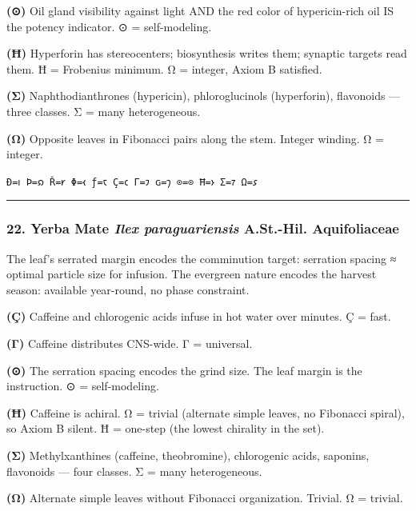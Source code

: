 \textbf{(⊙)} Oil gland visibility against light AND the red color of
hypericin-rich oil IS the potency indicator. ⊙ = self-modeling.

\textbf{(Ħ)} Hyperforin has stereocenters; biosynthesis writes them;
synaptic targets read them. Ħ = Frobenius minimum. Ω = integer, Axiom B
satisfied.

\textbf{(Σ)} Naphthodianthrones (hypericin), phloroglucinols
(hyperforin), flavonoids --- three classes. Σ = many heterogeneous.

\textbf{(Ω)} Opposite leaves in Fibonacci pairs along the stem. Integer
winding. Ω = integer.

\texttt{Ð=𐑦\ Þ=𐑸\ Ř=𐑾\ Φ=𐑬\ ƒ=𐑱\ Ç=𐑤\ Γ=𐑲\ ɢ=𐑠\ ⊙=⊙\ Ħ=𐑶\ Σ=𐑳\ Ω=𐑭}

\begin{center}\rule{0.5\linewidth}{0.5pt}\end{center}

\hypertarget{yerba-mate-ilex-paraguariensis-a.st.-hil.-aquifoliaceae}{%
\subsubsection{\texorpdfstring{22. Yerba Mate \textbar{} \emph{Ilex
paraguariensis} A.St.-Hil. \textbar{}
Aquifoliaceae}{22. Yerba Mate \textbar{} Ilex paraguariensis A.St.-Hil. \textbar{} Aquifoliaceae}}\label{yerba-mate-ilex-paraguariensis-a.st.-hil.-aquifoliaceae}}

The leaf's serrated margin encodes the comminution target: serration
spacing ≈ optimal particle size for infusion. The evergreen nature
encodes the harvest season: available year-round, no phase constraint.

\textbf{(Ç)} Caffeine and chlorogenic acids infuse in hot water over
minutes. Ç = fast.

\textbf{(Γ)} Caffeine distributes CNS-wide. Γ = universal.

\textbf{(⊙)} The serration spacing encodes the grind size. The leaf
margin is the instruction. ⊙ = self-modeling.

\textbf{(Ħ)} Caffeine is achiral. Ω = trivial (alternate simple leaves,
no Fibonacci spiral), so Axiom B silent. Ħ = one-step (the lowest
chirality in the set).

\textbf{(Σ)} Methylxanthines (caffeine, theobromine), chlorogenic acids,
saponins, flavonoids --- four classes. Σ = many heterogeneous.

\textbf{(Ω)} Alternate simple leaves without Fibonacci organization.
Trivial. Ω = trivial.

